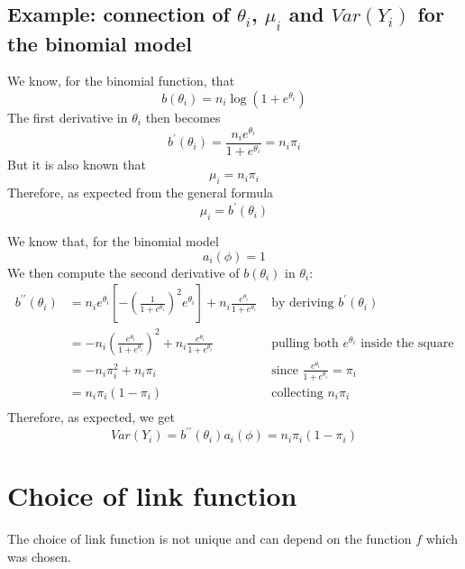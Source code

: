     \subsection{Example: connection of $\theta_i$, $\mu_i$ and $Var(Y_i)$ for the binomial model}
      We know, for the binomial function, that
      $$b(\theta_i) = n_i\log(1+e^{\theta_i})$$
      The first derivative in $\theta_i$ then becomes
      $$b^\prime(\theta_i) = \frac{n_ie^{\theta_i}}{1+e^{\theta_i}} = n_i\pi_i$$
      But it is also known that
      $$\mu_i = n_i\pi_i$$
      Therefore, as expected from the general formula
      $$\mu_i = b^\prime(\theta_i)$$
      
      We know that, for the binomial model
      $$a_i(\phi) = 1$$
      We then compute the second derivative of $b(\theta_i)$ in $\theta_i$:
      \begin{align*}
      b^{\prime\prime}(\theta_i) 
        &= n_ie^{\theta_i}\left[-\left(\frac{1}{1+e^{\theta_i}}\right)^2e^{\theta_i}\right] + n_i\frac{e^{\theta_i}}{1+e^{\theta_i}}
        & \text{ by deriving } b^\prime(\theta_i)\\
        &= -n_i\left(\frac{e^{\theta_i}}{1+e^{\theta_i}}\right)^2 + n_i\frac{e^{\theta_i}}{1+e^{\theta_i}}
        & \text{ pulling both } e^{\theta_i} \text{ inside the square}\\
        &= -n_i\pi_i^2+n_i\pi_i
        & \text{ since } \frac{e^{\theta_i}}{1+e^{\theta_i}} = \pi_i\\
        &= n_i\pi_i(1-\pi_i)
        & \text{ collecting } n_i\pi_i\\
      \end{align*}
      Therefore, as expected, we get
      $$Var(Y_i) = b^{\prime\prime}(\theta_i)a_i(\phi) = n_i\pi_i(1-\pi_i)$$

  \section{Choice of link function}
    The choice of link function is not unique and can depend on the function $f$ which was chosen.

